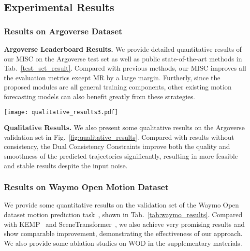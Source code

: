 \documentclass[10pt,twocolumn,letterpaper]{article}
\begin{document}
\subsection{Experimental Results}
\subsubsection{Results on Argoverse Dataset}
\noindent\textbf{Argoverse Leaderboard Results.} We provide detailed quantitative results of our MISC on the Argoverse test set as well as public state-of-the-art methods in Tab.~\ref{test_set_result}. Compared with previous methods, our MISC improves all the evaluation metrics except MR by a large margin. Furtherly, since the proposed modules are all general training components, other existing motion forecasting  models can also benefit greatly from these strategies. 


\begin{figure*}
    \centering
    \texttt{[image: qualitative\_results3.pdf]}
\caption{The past trajectory is in yellow, the predicted trajectory is in green, and the ground truth is in red. The top row of the figure shows the results without consistency, while the bottom row shows the results with consistency}
    \label{fig:qualitative_results}
    
\end{figure*}
\noindent\textbf{Qualitative Results.} We also present some qualitative results on the Argoverse validation set in Fig.~\ref{fig:qualitative_results}. Compared with results without consistency, the Dual Consistency Constraints improve both the quality and smoothness of the predicted trajectories significantly, resulting in more feasible and stable results despite the input noise.  

\subsubsection{Results on Waymo Open Motion Dataset}
We provide some quantitative results on the validation set of the Waymo Open dataset motion prediction task~\cite{ettinger2021large}, shown in Tab.~\ref{tab:waymo_results}. Compared with KEMP~\cite{lu2022kemp} and SceneTransformer~\cite{ngiam2021scene}, we also achieve very promising results and show comparable improvement, demonstrating the effectiveness of our approach. We also provide some ablation studies on WOD in the supplementary materials.
\end{document}

